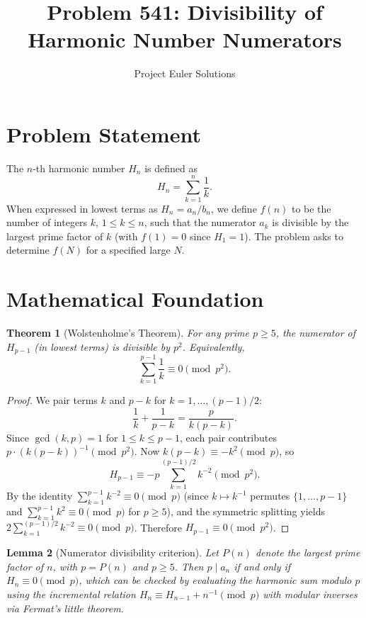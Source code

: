 \documentclass[11pt]{article}
\title{Problem 541: Divisibility of Harmonic Number Numerators}
\author{Project Euler Solutions}
\date{}
\newtheorem{theorem}{Theorem}
\newtheorem{lemma}[theorem]{Lemma}
\begin{document}
\maketitle

\section{Problem Statement}

The $n$-th harmonic number $H_n$ is defined as
\[
H_n = \sum_{k=1}^{n} \frac{1}{k}.
\]
When expressed in lowest terms as $H_n = a_n / b_n$, we define $f(n)$ to be the number of integers $k$, $1 \le k \le n$, such that the numerator $a_k$ is divisible by the largest prime factor of $k$ (with $f(1) = 0$ since $H_1 = 1$). The problem asks to determine $f(N)$ for a specified large $N$.

\section{Mathematical Foundation}

\begin{theorem}[Wolstenholme's Theorem]
For any prime $p \ge 5$, the numerator of $H_{p-1}$ (in lowest terms) is divisible by $p^2$. Equivalently,
\[
\sum_{k=1}^{p-1} \frac{1}{k} \equiv 0 \pmod{p^2}.
\]
\end{theorem}

\begin{proof}
We pair terms $k$ and $p - k$ for $k = 1, \ldots, (p-1)/2$:
\[
\frac{1}{k} + \frac{1}{p-k} = \frac{p}{k(p-k)}.
\]
Since $\gcd(k, p) = 1$ for $1 \le k \le p-1$, each pair contributes $p \cdot (k(p-k))^{-1} \pmod{p^2}$. Now $k(p-k) \equiv -k^2 \pmod{p}$, so
\[
H_{p-1} \equiv -p \sum_{k=1}^{(p-1)/2} k^{-2} \pmod{p^2}.
\]
By the identity $\sum_{k=1}^{p-1} k^{-2} \equiv 0 \pmod{p}$ (since $k \mapsto k^{-1}$ permutes $\{1, \ldots, p-1\}$ and $\sum_{k=1}^{p-1} k^2 \equiv 0 \pmod{p}$ for $p \ge 5$), and the symmetric splitting yields $2 \sum_{k=1}^{(p-1)/2} k^{-2} \equiv 0 \pmod{p}$. Therefore $H_{p-1} \equiv 0 \pmod{p^2}$.
\end{proof}

\begin{lemma}[Numerator divisibility criterion]
Let $P(n)$ denote the largest prime factor of $n$, with $p = P(n)$ and $p \ge 5$. Then $p \mid a_n$ if and only if $H_n \equiv 0 \pmod{p}$, which can be checked by evaluating the harmonic sum modulo $p$ using the incremental relation $H_n \equiv H_{n-1} + n^{-1} \pmod{p}$ with modular inverses via Fermat's little theorem.
\end{lemma}
\end{document}
